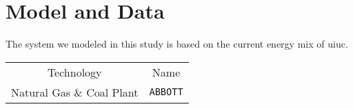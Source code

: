 \section{Model and Data}

The system we modeled in this study is based on the current energy mix of
\gls{uiuc}.

\begin{table*}[ht]
  \centering
  \begin{tabular}{cc}
    Technology & Name \\
    Natural Gas \& Coal Plant & \texttt{ABBOTT}\\
  \end{tabular}
\end{table*}


